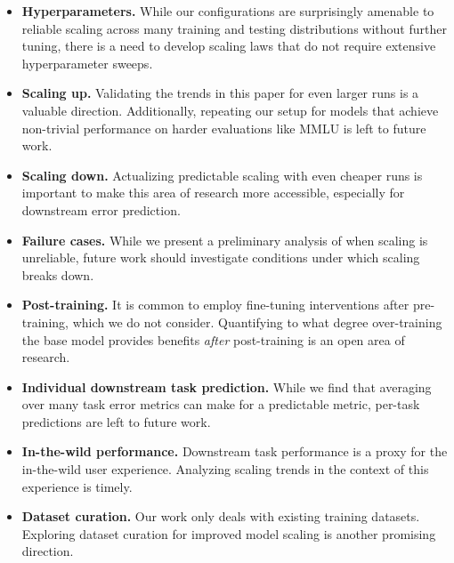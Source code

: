 \documentclass[dvipsnames,11pt]{article}
\begin{document}
\begin{itemize}[leftmargin=5mm]
    \vspace*{-1mm}
    \item \textbf{Hyperparameters.}
    While our configurations are surprisingly amenable to reliable scaling across many training and testing distributions without further tuning, there is a need to develop scaling laws that do not require extensive hyperparameter sweeps.
    \vspace*{-1mm}
    \item \textbf{Scaling up.} Validating the trends in this paper for even larger runs is a valuable direction. Additionally, repeating our setup for models that achieve non-trivial performance on harder evaluations like MMLU is left to future work.
    \vspace*{-1mm}
    \item \textbf{Scaling down.} Actualizing predictable scaling with even cheaper runs is important to make this area of research more accessible, especially for downstream error prediction.
    \vspace*{-1mm}
    \item \textbf{Failure cases.} While we present a preliminary analysis of when scaling is unreliable, future work should investigate conditions under which scaling breaks down.
    \vspace*{-1mm}
    \item \textbf{Post-training.} It is common to employ fine-tuning interventions after pre-training, which we do not consider.
    Quantifying to what degree over-training the base model provides benefits \emph{after} post-training is an open area of research.
    \vspace*{-1mm}
    \item \textbf{Individual downstream task prediction.}
    While we find that averaging over many task error metrics can make for a predictable metric, per-task predictions are left to future work.
    \vspace*{-1mm}
    \item  \textbf{In-the-wild performance.}
    Downstream task performance is a proxy for the in-the-wild user experience.
    Analyzing scaling trends in the context of this experience is timely.
    \vspace*{-1mm}
    \item \textbf{Dataset curation.} Our work only deals with existing training datasets.
    Exploring dataset curation for improved model scaling is another promising direction.
    \vspace*{-1mm}
\end{itemize}
\end{document}
